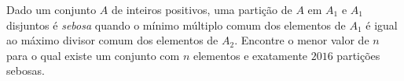 Dado um conjunto $A$ de inteiros positivos, uma partição de $A$ em $A_1$ e $A_1$ disjuntos é \emph{sebosa} quando o mínimo múltiplo comum dos elementos de $A_1$ é igual ao máximo divisor comum dos elementos de $A_2$.
Encontre o menor valor de $n$ para o qual existe um conjunto com $n$ elementos e exatamente $2016$ partições sebosas.
